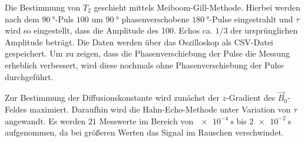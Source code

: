 Die Bestimmung von $T_2$ geschieht mittels Meiboom-Gill-Methode. Hierbei werden nach dem $\SI{90}{\degree}$-Puls $100$ um $\SI{90}{\degree}$ phasenverschobene $\SI{180}{\degree}$-Pulse eingestrahlt und $\tau$ wird so eingestellt, dass die Amplitude des 100. Echos ca. $1/3$ der ursprünglichen Amplitude beträgt. Die Daten werden über das Oszilloskop als CSV-Datei gespeichert. Um zu zeigen, dass die Phasenverschiebung der Pulse die Messung erheblich verbessert, wird diese nochmals ohne Phasenverschiebung der Pulse durchgeführt.

Zur Bestimmung der Diffusionskonstante wird zunächst der $z$-Gradient des $\vec{B}_0$-Feldes maximiert. Daraufhin wird die Hahn-Echo-Methode unter Variation von $\tau$ angewandt. Es werden $21$ Messwerte im Bereich von $\SI{e-4}{\second}$ bis $\SI{2e-2}{\second}$ aufgenommen, da bei größeren Werten das Signal im Rauschen verschwindet.

